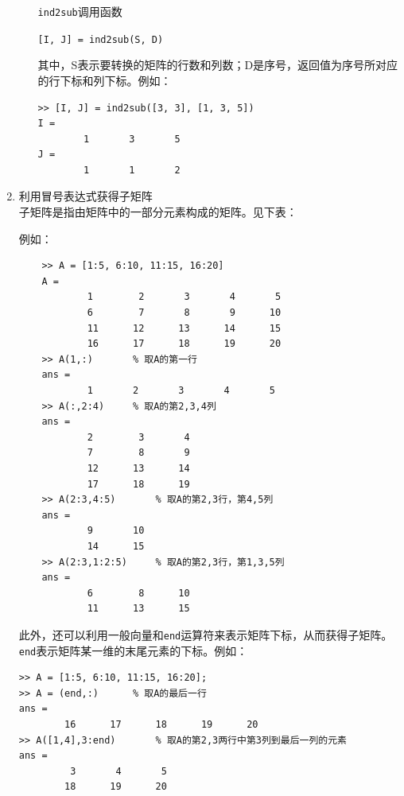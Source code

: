 \begin{enumerate}
\begin{enumerate}
	\lstinline|ind2sub|调用函数
	\begin{center}
		\lstinline|[I, J] = ind2sub(S, D)|
	\end{center}
	其中，S表示要转换的矩阵的行数和列数；D是序号，返回值为序号所对应的行下标和列下标。例如：
\begin{lstlisting}
>> [I, J] = ind2sub([3, 3], [1, 3, 5])
I = 
		1		3		5
J = 
		1		1		2
\end{lstlisting}
	\end{enumerate}

\item 利用冒号表达式获得子矩阵\\
子矩阵是指由矩阵中的一部分元素构成的矩阵。见下表：
\begin{table}[!htb]
	\centering
\end{table}

\newpage
例如：
\begin{lstlisting}
	>> A = [1:5, 6:10, 11:15, 16:20]
	A = 
			1		 2		 3		 4		 5
			6		 7		 8		 9		10
			11		12		13		14		15
			16		17		18		19		20
	>> A(1,:)		% 取A的第一行
	ans = 
			1		2		3		4		5
	>> A(:,2:4)		% 取A的第2,3,4列
	ans = 
			2		 3		 4
			7		 8		 9
			12		13		14
			17		18		19
	>> A(2:3,4:5)		% 取A的第2,3行，第4,5列
	ans = 
			9		10
			14		15
	>> A(2:3,1:2:5)		% 取A的第2,3行，第1,3,5列
	ans =
			6		 8		10
			11		13		15 
\end{lstlisting}
此外，还可以利用一般向量和\lstinline|end|运算符来表示矩阵下标，从而获得子矩阵。\lstinline|end|表示矩阵某一维的末尾元素的下标。例如：
\begin{lstlisting}
>> A = [1:5, 6:10, 11:15, 16:20];
>> A = (end,:)		% 取A的最后一行
ans =
		16		17		18		19		20
>> A([1,4],3:end)		% 取A的第2,3两行中第3列到最后一列的元素
ans = 
		 3		 4		 5
		18		19		20	
\end{lstlisting}


\end{enumerate}
